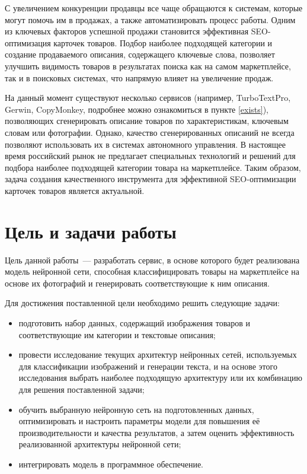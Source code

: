 \documentclass[a4paper,12pt]{extarticle}
\begin{document}
С увеличением конкуренции продавцы все чаще обращаются к системам, которые могут помочь им в продажах, а также автоматизировать процесс работы. Одним из ключевых факторов успешной продажи становится эффективная SEO-оптимизация карточек товаров. Подбор наиболее подходящей категории и создание продаваемого описания, содержащего ключевые слова, позволяет улучшить видимость товаров в результатах поиска как на самом маркетплейсе, так и в поисковых системах, что напрямую влияет на увеличение продаж.

На данный момент существуют несколько сервисов (например, TurboTextPro, Gerwin, CopyMonkey, подробнее можно ознакомиться в пункте \ref{exists}), позволяющих сгенерировать описание товаров по характеристикам, ключевым словам или фотографии. Однако, качество сгенерированных описаний не всегда позволяют использовать их в системах автономного управления. В настоящее время российский рынок не предлагает специальных технологий и решений для подбора наиболее подходящей категории товара на маркетплейсе. Таким образом, задача создания качественного инструмента для эффективной SEO-оптимизации карточек товаров является актуальной. 


\newpage
\section{Цель и задачи работы}

Цель данной работы — разработать сервис, в основе которого будет реализована модель нейронной сети, способная классифицировать товары на маркетплейсе на основе их фотографий и генерировать соответствующие к ним описания.

Для достижения поставленной цели необходимо решить следующие задачи:
\begin{itemize}
	\item подготовить набор данных, содержащий изображения товаров и соответствующие им категории и текстовые описания;
	\item провести исследование текущих архитектур нейронных сетей, используемых для классификации изображений и генерации текста, и на основе этого исследования выбрать наиболее подходящую архитектуру или их комбинацию для решения поставленной задачи;
	\item обучить выбранную нейронную сеть на подготовленных данных, оптимизировать и настроить параметры модели для повышения её производительности и качества результатов, а затем оценить эффективность реализованной архитектуры нейронной сети;
	\item интегрировать модель в программное обеспечение.
\end{itemize}
\end{document}
